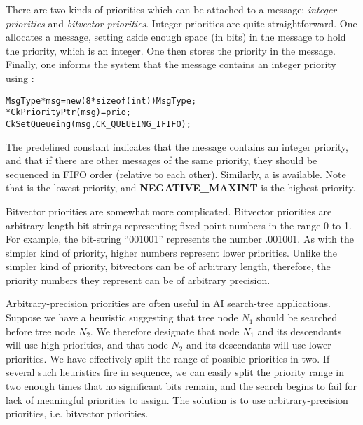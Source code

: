 
There are two kinds of priorities which can be attached to a message:
{\sl integer priorities} and {\sl bitvector
priorities}.  Integer priorities are quite
straightforward.  One allocates a message, setting aside enough space
(in bits) in the message to hold the priority, which is an integer.
One then stores the priority in the message.  Finally, one informs the
system that the message contains an integer priority using
:

\begin{alltt}
  MsgType *msg = new (8*sizeof(int)) MsgType;
  *CkPriorityPtr(msg) = prio;
  CkSetQueueing(msg, CK_QUEUEING_IFIFO);
\end{alltt}

The predefined constant   indicates that the
message contains an integer priority, and that if there are other
messages of the same priority, they should be sequenced in FIFO order
(relative to each other).  Similarly, a   is
available.  Note that   is the lowest priority, and {\bf
NEGATIVE\_MAXINT} is the highest priority.

Bitvector priorities are somewhat more complicated.  Bitvector
priorities are arbitrary-length bit-strings representing fixed-point
numbers in the range 0 to 1.  For example, the bit-string ``001001''
represents the number .001001\raisebox{-.5ex}{\scriptsize binary}.  As
with the simpler kind of priority, higher numbers represent lower
priorities.  Unlike the simpler kind of priority, bitvectors can be of
arbitrary length, therefore, the priority numbers they represent can
be of arbitrary precision.

Arbitrary-precision priorities
are often useful in AI search-tree applications.  Suppose we have a
heuristic suggesting that tree node $N_1$ should be searched before
tree node $N_2$.  We therefore designate that node $N_1$ and its
descendants will use high priorities, and that node $N_2$ and its
descendants will use lower priorities.  We have effectively split the
range of possible priorities in two.  If several such heuristics fire
in sequence, we can easily split the priority range  in two enough times that no significant bits remain,
and the search begins to fail for lack of meaningful priorities to
assign.  The solution is to use arbitrary-precision priorities,
i.e. bitvector priorities.

